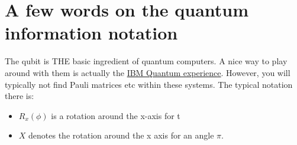 \section{A few words on the quantum information notation}

The qubit is THE basic ingredient of quantum computers. A nice way to play around with them is actually the \href{https://quantum-computing.ibm.com/}{IBM Quantum experience}. However, you will typically not find Pauli matrices etc within these systems. The typical notation there is:
\begin{itemize}
\item $R_x(\phi)$ is a rotation around the x-axis for t 
\item $X$ denotes the rotation around the x axis for an angle $\pi$.
\end{itemize}